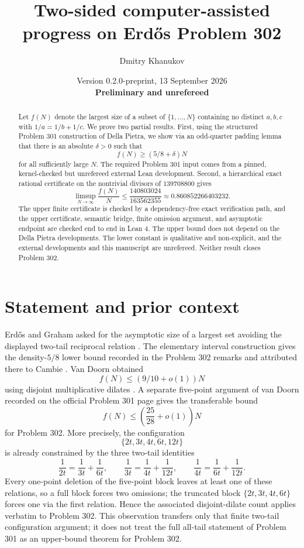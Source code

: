 \documentclass[11pt]{article}
\title{Two-sided computer-assisted progress on Erd\H{o}s Problem 302}
\author{Dmitry Khanukov}
\date{Version 0.2.0-preprint, 13 September 2026\\[0.5ex]
\textbf{Preliminary and unrefereed}}
\theoremstyle{definition}
\theoremstyle{plain}
\begin{document}
\maketitle

\begin{abstract}
Let $f(N)$ denote the largest size of a subset of $\{1,\ldots,N\}$
containing no distinct $a,b,c$ with $1/a=1/b+1/c$.  We prove two partial
results.  First, using the structured Problem 301 construction of Della
Pietra, we show via an odd-quarter padding lemma that there is an absolute
$\delta>0$ such that
\[
  f(N)\geq(5/8+\delta)N
\]
for all sufficiently large $N$.  The required Problem 301 input comes from a
pinned, kernel-checked but unrefereed external Lean development.  Second, a
hierarchical exact rational
certificate on the nontrivial divisors of $139708800$ gives
\[
  \limsup_{N\to\infty}\frac{f(N)}N
  \leq\frac{140803024}{163562355}
  \approx 0.860852266403232.
\]
The upper finite certificate is checked by a dependency-free exact
verification path, and the upper certificate, semantic bridge, finite
omission argument, and asymptotic endpoint are checked end to end in Lean 4.
The upper bound does not depend on the Della Pietra developments.  The lower
constant is qualitative and non-explicit, and the external developments and
this manuscript are unrefereed. Neither result closes Problem 302.
\end{abstract}

\section{Statement and prior context}

Erd\H{o}s and Graham asked for the asymptotic size of a largest set avoiding
the displayed two-tail reciprocal relation \cite{ErdosGraham1980,Erdos302}.
The elementary interval construction gives the density-$5/8$ lower bound
recorded in the Problem 302 remarks and attributed there to Cambie
\cite{Cambie302}.  Van Doorn obtained
\[
 f(N)\leq(9/10+o(1))N
\]
using disjoint multiplicative dilates \cite{VanDoorn302}.  A separate
five-point argument of van Doorn recorded on the official Problem 301 page
\cite{Erdos301} gives the transferable bound
\[
 f(N)\leq\left(\frac{25}{28}+o(1)\right)N
\]
for Problem 302.  More precisely, the configuration
\[
 \{2t,3t,4t,6t,12t\}
\]
is already constrained by the three two-tail identities
\[
 \frac1{2t}=\frac1{3t}+\frac1{6t},\qquad
 \frac1{3t}=\frac1{4t}+\frac1{12t},\qquad
 \frac1{4t}=\frac1{6t}+\frac1{12t}.
\]
Every one-point deletion of the five-point block leaves at least one of these
relations, so a full block forces two omissions; the truncated block
$\{2t,3t,4t,6t\}$ forces one via the first relation.  Hence the associated
disjoint-dilate count applies verbatim to Problem 302.  This observation
transfers only that finite two-tail configuration argument; it does not treat
the full all-tail statement of Problem 301 as an upper-bound theorem for
Problem 302.
\end{document}
